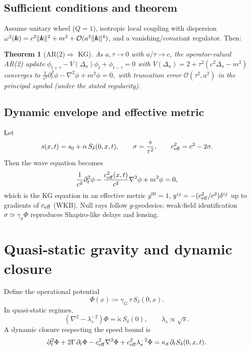 \documentclass[12pt]{article}
\newtheorem{theorem}{Theorem}[section]
\theoremstyle{definition}
\newcommand{\defeq}{\coloneqq}
\DeclarePairedDelimiter{\norm}{\lVert}{\rVert}
\newcommand{\bigO}{\mathcal{O}}
\begin{document}
\subsection{Sufficient conditions and theorem}
Assume unitary wheel ($Q{=}1$), isotropic local coupling with dispersion $\omega^2(\bm k)=c^2\norm{\bm k}^2+m^2+\bigO(a^2\norm{\bm k}^4)$, and a vanishing/covariant regulator. Then:
\begin{theorem}[AR(2)$\Rightarrow$ KG]
As $a,\tau\to0$ with $a/\tau\to c$, the operator-valued AR(2) update
\(
\phi_{t+\tau}-V(\Delta_a)\phi_t+\phi_{t-\tau}=0
\)
with $V(\Delta_a)=2+\tau^2(c^2\Delta_a-m^2)$ converges to
\(
\frac{1}{c^2}\partial_t^2\phi-\nabla^2\phi+m^2\phi=0,
\)
with truncation error $\mathcal O(\tau^2,a^2)$ in the principal symbol (under the stated regularity).
\end{theorem}

\subsection{Dynamic envelope and effective metric}
Let
\begin{equation}
s(x,t)=s_0+\alpha\,S_\delta(0,x,t),\qquad \sigma=\frac{s}{\tau^2},\qquad c_{\rm eff}^2=c^2-2\sigma.
\end{equation}
Then the wave equation becomes
\begin{equation}
\frac{1}{c^2}\partial_t^2\phi-\frac{c_{\rm eff}^2(x,t)}{c^2}\nabla^2\phi+m^2\phi=0,
\end{equation}
which is the KG equation in an effective metric $g^{00}=1$, $g^{ij}=-(c_{\rm eff}^2/c^2)\delta^{ij}$ up to gradients of $c_{\rm eff}$ (WKB). Null rays follow $g$-geodesics; weak-field identification $\sigma\simeq \gamma_\sigma \Phi$ reproduces Shapiro-like delays and lensing.

\section{Quasi-static gravity and dynamic closure}\label{sec:newton-tele}
Define the operational potential
\begin{equation}
\Phi(x)\defeq \gamma_G\,\tau\,S_\delta(0,x).
\end{equation}
In quasi-static regimes,
\begin{equation}
(\nabla^2-\lambda_s^{-2})\Phi=\tilde\kappa\,S_\delta(0),\qquad \lambda_s\propto \sqrt{s}.
\end{equation}
A dynamic closure respecting the speed bound is
\begin{equation}
\partial_t^2\Phi+2\Gamma\,\partial_t\Phi-c_{\rm eff}^2\nabla^2\Phi+c_{\rm eff}^2\lambda_s^{-2}\Phi=\kappa_d\,\partial_t S_\delta(0,x,t).
\end{equation}
\end{document}
